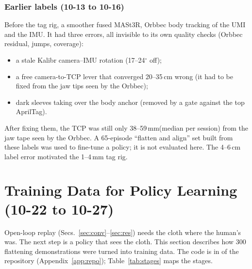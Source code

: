 \documentclass[conference,10pt]{IEEEtran}
\newcommand{\mm}{\,mm\xspace}
\begin{document}
\subsubsection{Earlier labels (10-13 to 10-16)}
Before the tag rig, a smoother fused MASt3R, Orbbec body tracking of the UMI and the IMU. It had three errors, all
invisible to its own quality checks (Orbbec residual, jumps, coverage):
\begin{itemize}
\item a stale Kalibr camera--IMU rotation (17--24$^\circ$ off);
\item a free camera-to-TCP lever that converged 20--35\,cm wrong (it had to be fixed from the jaw tips seen by the Orbbec);
\item dark sleeves taking over the body anchor (removed by a gate against the top AprilTag).
\end{itemize}
After fixing them, the TCP was still only 38--59\mm (median per session) from the jaw tape seen by the Orbbec. A 65-episode
``flatten and align'' set built from these labels was used to fine-tune a policy; it is not evaluated here. The 4--6\,cm
label error motivated the 1--4\mm tag rig.

\section{Training Data for Policy Learning (10-22 to 10-27)}\label{sec:train}
Open-loop replay (Secs.~\ref{sec:conv}--\ref{sec:res}) needs the cloth where the human's was. The next step is a policy
that sees the cloth. This section describes how 300 flattening demonstrations were turned into training data. The code is
in  of the repository (Appendix~\ref{app:repo}); Table~\ref{tab:stages} maps the stages.
\end{document}
